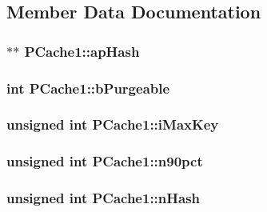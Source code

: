 \subsection{Member Data Documentation}
\hypertarget{struct_p_cache1_a1169ec7ba2a628d89841d16ced651e1f}{
\subsubsection[{ap\-Hash}]{$\ast$$\ast$ P\-Cache1\-::ap\-Hash}}\label{struct_p_cache1_a1169ec7ba2a628d89841d16ced651e1f}
\hypertarget{struct_p_cache1_a2af7d24e27369252addec9bef45afcfc}{
\subsubsection[{b\-Purgeable}]{\setlength{\rightskip}{0pt plus 5cm}int P\-Cache1\-::b\-Purgeable}}\label{struct_p_cache1_a2af7d24e27369252addec9bef45afcfc}
\hypertarget{struct_p_cache1_a2dff616ad2d1873ad3a8d20d53bcb4d0}{
\subsubsection[{i\-Max\-Key}]{\setlength{\rightskip}{0pt plus 5cm}unsigned int P\-Cache1\-::i\-Max\-Key}}\label{struct_p_cache1_a2dff616ad2d1873ad3a8d20d53bcb4d0}
\hypertarget{struct_p_cache1_a8a5c5ab7d71e66c2a4df3f22513888f0}{
\subsubsection[{n90pct}]{\setlength{\rightskip}{0pt plus 5cm}unsigned int P\-Cache1\-::n90pct}}\label{struct_p_cache1_a8a5c5ab7d71e66c2a4df3f22513888f0}
\hypertarget{struct_p_cache1_a09d9488a8a3a52822e33dd43e14c69e1}{
\subsubsection[{n\-Hash}]{\setlength{\rightskip}{0pt plus 5cm}unsigned int P\-Cache1\-::n\-Hash}}\label{struct_p_cache1_a09d9488a8a3a52822e33dd43e14c69e1}
